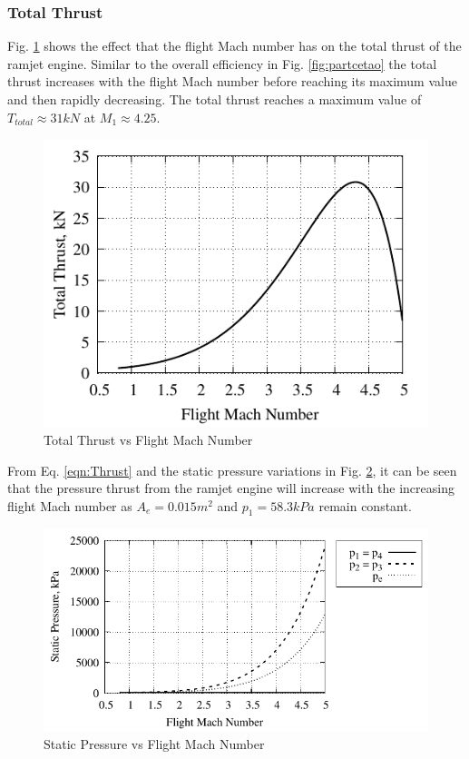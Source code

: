 \documentclass[conf]{new-aiaa} %
\begin{document}
\subsubsection{Total Thrust}
Fig. \ref{fig:partct} shows the effect that the flight Mach number has on the total thrust of the ramjet engine. Similar to the overall efficiency in Fig. \ref{fig:partcetao} the total thrust increases with the flight Mach number before reaching its maximum value and then rapidly decreasing. The total thrust reaches a maximum value of $T_{total}\approx31kN$ at $M_1\approx4.25$.

\begin{figure}[H] %
    \centering
    \includegraphics[]{media/performance_parameter_files/part_c_T.pdf}
    \caption{\label{fig:partct}Total Thrust vs Flight Mach Number}
\end{figure}
From Eq. \ref{eqn:Thrust} and the static pressure variations in Fig. \ref{fig:partcstatpres}, it can be seen that the pressure thrust from the ramjet engine will increase with the increasing flight Mach number as $A_e=0.015m^2$ and $p_1=58.3kPa$ remain constant.

\begin{figure}[H] %
    \centering
    \includegraphics[]{media/performance_parameter_files/part_c_static_pressure.pdf}
    \caption{\label{fig:partcstatpres}Static Pressure vs Flight Mach Number}
\end{figure}
\end{document}
